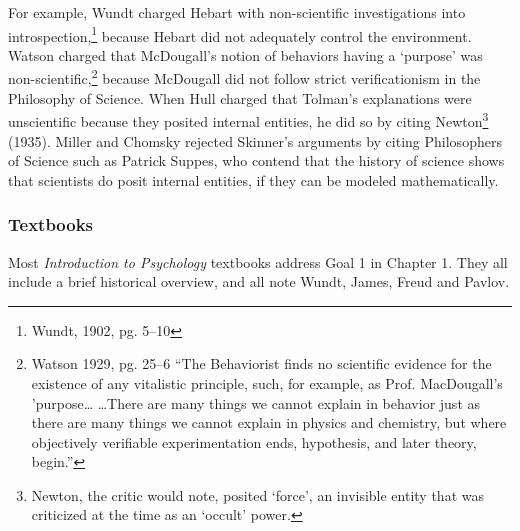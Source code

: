 \begin{refsection}
For example, Wundt charged Hebart with non-scientific investigations into introspection,\footnote{Wundt, 1902, pg. 5--10} because Hebart did not adequately control the environment. Watson charged that McDougall's notion of behaviors having a `purpose' was non-scientific,\footnote{Watson 1929, pg. 25--6 “The Behaviorist finds no scientific evidence for the existence of any vitalistic principle, such, for example, as Prof. MacDougall's 'purpose{\ldots} {\ldots}There are many things we cannot explain in behavior just as there are many things we cannot explain in physics and chemistry, but where objectively verifiable experimentation ends, hypothesis, and later theory, begin.”} because McDougall did not follow strict verificationism in the Philosophy of Science. When Hull charged that Tolman's explanations were unscientific because they posited internal entities, he did so by citing Newton\footnote{Newton, the critic would note, posited `force', an invisible entity that was criticized at the time as an `occult' power.} (1935). Miller and Chomsky rejected Skinner's arguments by citing Philosophers of Science such as Patrick Suppes, who contend that the history of science shows that scientists do posit internal entities, if they can be modeled mathematically.

\subsubsection{Textbooks}
\label{textbooks}

Most \emph{Introduction to Psychology} textbooks address Goal 1 in Chapter 1. They all include a brief historical overview, and all note Wundt, James, Freud and Pavlov. 


\end{refsection}
